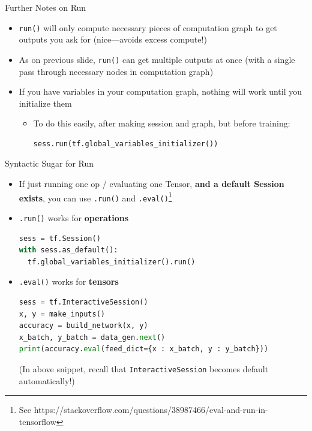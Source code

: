 \documentclass[]{beamer}
\begin{document}
\begin{frame}[fragile]{Further Notes on Run}

\begin{itemize}
\item \verb|run()| will only compute necessary pieces of computation graph to get outputs you ask for (nice---avoids excess compute!)
\item As on previous slide, \verb|run()| can get multiple outputs at once (with a single pass through necessary nodes in computation graph)
\item If you have variables in your computation graph, nothing will work until you initialize them
\begin{itemize}
\item To do this easily, after making session and graph, but before training:
\begin{lstlisting}[language=python]
sess.run(tf.global_variables_initializer())
\end{lstlisting}
\end{itemize}
\end{itemize}

\end{frame}

\begin{frame}[fragile]{Syntactic Sugar for Run}

\begin{itemize}
\item If just running one op / evaluating one Tensor, \textbf{and a default Session exists}, you can use \verb|.run()| and \verb|.eval()|\footnote{See https://stackoverflow.com/questions/38987466/eval-and-run-in-tensorflow}

\item \verb|.run()| works for \textbf{operations}
\begin{lstlisting}[language=python]
sess = tf.Session()
with sess.as_default():
  tf.global_variables_initializer().run()
\end{lstlisting}

\item \verb|.eval()| works for \textbf{tensors}
\begin{lstlisting}[language=python]
sess = tf.InteractiveSession()
x, y = make_inputs()
accuracy = build_network(x, y)
x_batch, y_batch = data_gen.next()
print(accuracy.eval(feed_dict={x : x_batch, y : y_batch}))
\end{lstlisting}
(In above snippet, recall that \verb|InteractiveSession| becomes default automatically!)

\end{itemize}

\end{frame}
\end{document}
